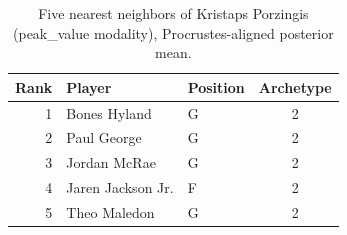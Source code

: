 \begin{table}[htbp]
  \centering\small
  \begin{tabular}{rllc}
    \toprule
    Rank & Player & Position & Archetype \\
    \midrule
    1 & Bones Hyland & G & 2 \\
    2 & Paul George & G & 2 \\
    3 & Jordan McRae & G & 2 \\
    4 & Jaren Jackson Jr. & F & 2 \\
    5 & Theo Maledon & G & 2 \\
    \bottomrule
  \end{tabular}
  \caption{Five nearest neighbors of Kristaps Porzingis (peak_value modality), Procrustes-aligned posterior mean.}
  \label{tab:Kristaps_Porzingis_neighbors_peak_value}
\end{table}

